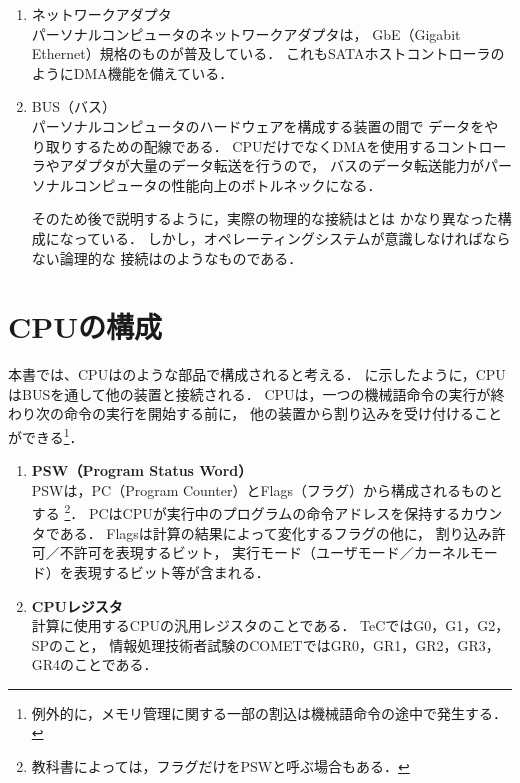 \begin{enumerate}
\item ネットワークアダプタ \\
パーソナルコンピュータのネットワークアダプタは，
GbE（Gigabit Ethernet）規格のものが普及している．
これもSATAホストコントローラのようにDMA機能を備えている．

\item BUS（バス） \\
パーソナルコンピュータのハードウェアを構成する装置の間で
データをやり取りするための配線である．
CPUだけでなくDMAを使用するコントローラやアダプタが大量のデータ転送を行うので，
バスのデータ転送能力がパーソナルコンピュータの性能向上のボトルネックになる．

そのため後で説明するように，実際の物理的な接続はとは
かなり異なった構成になっている．
しかし，オペレーティングシステムが意識しなければならない論理的な
接続はのようなものである．

\end{enumerate}

\section{CPUの構成}
本書では、CPUはのような部品で構成されると考える．
に示したように，CPUはBUSを通して他の装置と接続される．
CPUは，一つの機械語命令の実行が終わり次の命令の実行を開始する前に，
他の装置から割り込みを受け付けることができる\footnote{
例外的に，メモリ管理に関する一部の割込は機械語命令の途中で発生する．}．


\begin{enumerate}
\item {\bf PSW（Program Status Word）} \\
PSWは，PC（Program Counter）とFlags（フラグ）から構成されるものとする
\footnote{
教科書によっては，フラグだけをPSWと呼ぶ場合もある．}．
PCはCPUが実行中のプログラムの命令アドレスを保持するカウンタである．
Flagsは計算の結果によって変化するフラグの他に，
割り込み許可／不許可を表現するビット，
実行モード（ユーザモード／カーネルモード）を表現するビット等が含まれる．

\item {\bf CPUレジスタ} \\
計算に使用するCPUの汎用レジスタのことである．
TeCではG0，G1，G2，SPのこと，
情報処理技術者試験のCOMETではGR0，GR1，GR2，GR3，GR4のことである．

\end{enumerate}

